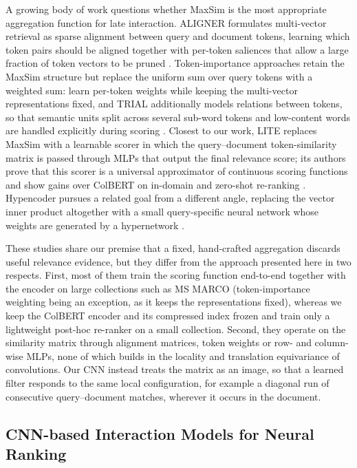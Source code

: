\documentclass[preprint,5p,times,twocolumn,authoryear]{elsarticle}
\begin{document}
A growing body of work questions whether MaxSim is the most appropriate aggregation function for late interaction. ALIGNER formulates multi-vector retrieval as sparse alignment between query and document tokens, learning which token pairs should be aligned together with per-token saliences that allow a large fraction of token vectors to be pruned \citep{qian2022aligner}. Token-importance approaches retain the MaxSim structure but replace the uniform sum over query tokens with a weighted sum: \citet{archish2025tokenimportance} learn per-token weights while keeping the multi-vector representations fixed, and TRIAL additionally models relations between tokens, so that semantic units split across several sub-word tokens and low-content words are handled explicitly during scoring \citep{kang2025trial}. Closest to our work, LITE replaces MaxSim with a learnable scorer in which the query--document token-similarity matrix is passed through MLPs that output the final relevance score; its authors prove that this scorer is a universal approximator of continuous scoring functions and show gains over ColBERT on in-domain and zero-shot re-ranking \citep{ji2024lite}. Hypencoder pursues a related goal from a different angle, replacing the vector inner product altogether with a small query-specific neural network whose weights are generated by a hypernetwork \citep{killingback2025hypencoder}.

These studies share our premise that a fixed, hand-crafted aggregation discards useful relevance evidence, but they differ from the approach presented here in two respects. First, most of them train the scoring function end-to-end together with the encoder on large collections such as MS MARCO (token-importance weighting \citep{archish2025tokenimportance} being an exception, as it keeps the representations fixed), whereas we keep the ColBERT encoder and its compressed index frozen and train only a lightweight post-hoc re-ranker on a small collection. Second, they operate on the similarity matrix through alignment matrices, token weights or row- and column-wise MLPs, none of which builds in the locality and translation equivariance of convolutions. Our CNN instead treats the matrix as an image, so that a learned filter responds to the same local configuration, for example a diagonal run of consecutive query--document matches, wherever it occurs in the document.

\subsection{CNN-based Interaction Models for Neural Ranking}
\end{document}
